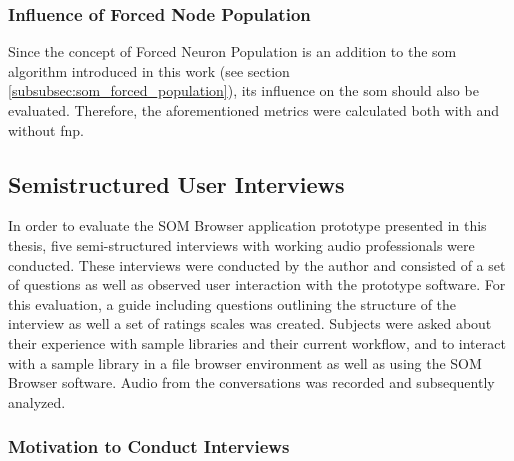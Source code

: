 \subsubsection{Influence of Forced Node Population}
\label{subsubsec:eval_fnp_influence}
Since the concept of Forced Neuron Population is an addition to the \gls{som}
algorithm introduced in this work (see section
\ref{subsubsec:som_forced_population}), its influence on the \gls{som} should
also be evaluated. Therefore, the aforementioned metrics were calculated
both with and without \gls{fnp}.


\subsection{Semistructured User Interviews}
\label{subsec:evaluation_interviews}

In order to evaluate the SOM Browser application prototype presented in this
thesis, five semi-structured interviews with working audio professionals were
conducted. These interviews were conducted by the author and consisted of a set
of questions as well as observed user interaction with the prototype software.
For this evaluation, a guide including questions outlining the
structure of the interview as well a set of ratings scales was created. Subjects
were asked about their experience with sample libraries and their current
workflow, and to interact with a sample library in a file browser environment as
well as using the SOM Browser software. Audio from the conversations was
recorded and subsequently analyzed.

\subsubsection{Motivation to Conduct Interviews}
\label{subsubsec:interview_motivation}

